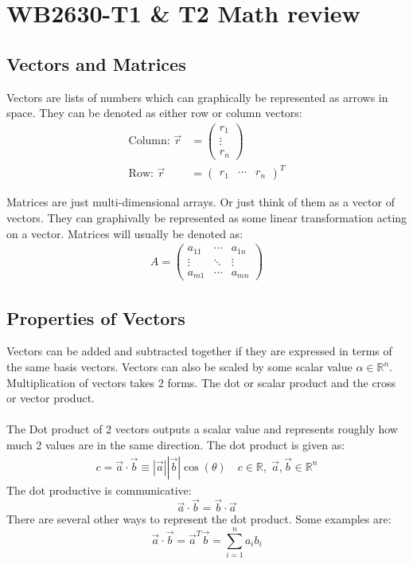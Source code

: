 \documentclass[11pt, a4paper]{article}
\newcommand*{\R}{\ensuremath{\mathbb{R}}}
\begin{document}
\setcounter{section}{-1}
\section{WB2630-T1 \& T2 Math review}


\subsection{Vectors and Matrices}
Vectors are lists of numbers which can graphically be represented as arrows in space. They can be denoted as either row or column vectors:
\begin{align*}
  \text{Column: }
  \vec{r} &= 
  \begin{pmatrix} 
    r_1 \\ 
    \vdots \\ r_n 
  \end{pmatrix}\\
  \text{Row: }
  \vec{r} &= \begin{pmatrix} r_1 & \cdots & r_n \end{pmatrix}^T
\end{align*}

Matrices are just multi-dimensional arrays. Or just think of them as a vector of vectors. They can graphivally be represented as some linear transformation acting on a vector. Matrices will usually be denoted as:
\begin{gather*}
  A = 
  \begin{pmatrix}
  a_{11} & \cdots & a_{1n}\\
  \vdots & \ddots & \vdots\\
  a_{m1} & \cdots & a_{mn}
  \end{pmatrix}
\end{gather*}


\subsection{Properties of Vectors}
Vectors can be added and subtracted together if they are expressed in terms of the same basis vectors. Vectors can also be scaled by some scalar value $\alpha \in \R^n$. Multiplication of vectors takes 2 forms. The dot or scalar product and the cross or vector product.\\
\\
The Dot product of 2 vectors outputs a scalar value and represents roughly how much 2 values are in the same direction. The dot product is given as:
\begin{gather*}
  c = \vec{a} \cdot \vec{b} \equiv |\vec{a}||\vec{b}|\cos(\theta) \quad c \in \R, \;\vec{a}, \vec{b} \in \R^n
\end{gather*}
The dot productive is communicative:
\begin{equation*}
  \vec{a} \cdot \vec{b} = \vec{b} \cdot \vec{a}
\end{equation*}
There are several other ways to represent the dot product. Some examples are:
\begin{equation*}
  \vec{a} \cdot \vec{b} = \vec{a}^T \vec{b} = \sum_{i=1}^{n} a_i b_i
\end{equation*}
\end{document}
